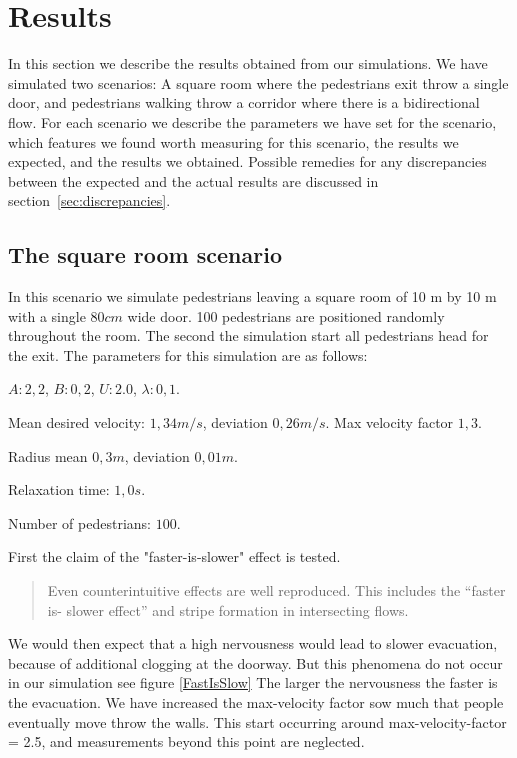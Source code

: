 \section{Results}
\label{sec:results}
In this section we describe the results obtained from our simulations. We have simulated two scenarios: A square room where the pedestrians exit throw a single door, and pedestrians walking throw a corridor where there is a bidirectional flow. For each scenario we describe the parameters we have set for the scenario, which features we found worth measuring for this scenario, the results we expected, and the results we obtained. Possible remedies for any discrepancies between the expected and the actual results are discussed in section~\ref{sec:discrepancies}.

\subsection{The square room scenario}
In this scenario we simulate pedestrians leaving a square room of 10 m by 10 m with a single $80cm$ wide door. 100 pedestrians are positioned randomly throughout the room. The second the simulation start all pedestrians head for the exit. The parameters for this simulation are as follows:
\begin{itemize*}
    \item $A: 2,2$, $B: 0,2$, $U: 2.0$, $\lambda: 0,1$.
    \item Mean desired velocity: $1,34 m/s$, deviation $0,26 m/s$. Max velocity factor $1,3$.
    \item Radius mean $0,3 m$, deviation $0,01 m$.
    \item Relaxation time: $1,0 s$.
    \item Number of pedestrians: $100$.
\end{itemize*}

First the claim of the "faster-is-slower" effect is tested.
\begin{quote}
Even counterintuitive
effects are well reproduced. This includes the “faster is-
slower effect” and stripe formation in intersecting flows. \cite{self-org}
\end{quote}
We would then expect that a high nervousness would lead to slower evacuation, because of additional clogging at the doorway. But this phenomena do not occur in our simulation see figure \ref{FastIsSlow}
The larger the nervousness the faster is the evacuation. We have increased the max-velocity factor sow much that people eventually move throw the walls. This start occurring around max-velocity-factor = 2.5, and measurements beyond this point are neglected.

